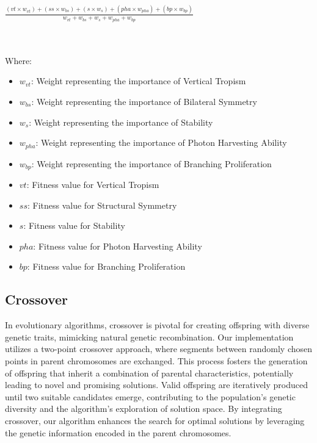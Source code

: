 \begin{large}
    $\frac{(vt \times w_{vt}) + (ss \times w_{bs}) + (s \times w_s) + (pha \times w_{pha}) + (bp \times w_{bp})}{w_{vt} + w_{bs} + w_s + w_{pha} + w_{bp}}$
\end{large}
\\
\\ 


Where:\\
\begin{itemize}
    \item $w_{vt}$: Weight representing the importance of Vertical Tropism
    \item $w_{bs}$: Weight representing the importance of Bilateral Symmetry
    \item $w_s$: Weight representing the importance of Stability
    \item $w_{pha}$: Weight representing the importance of Photon Harvesting Ability
    \item $w_{bp}$: Weight representing the importance of Branching Proliferation
    \item $vt$: Fitness value for Vertical Tropism
    \item $ss$: Fitness value for Structural Symmetry
    \item $s$: Fitness value for Stability
    \item $pha$: Fitness value for Photon Harvesting Ability
    \item $bp$: Fitness value for Branching Proliferation
\end{itemize}



\subsection{Crossover}
In evolutionary algorithms, crossover is pivotal for creating offspring with diverse genetic traits, mimicking natural genetic recombination. Our implementation utilizes a two-point crossover approach, where segments between randomly chosen points in parent chromosomes are exchanged. This process fosters the generation of offspring that inherit a combination of parental characteristics, potentially leading to novel and promising solutions. Valid offspring are iteratively produced until two suitable candidates emerge, contributing to the population's genetic diversity and the algorithm's exploration of solution space. By integrating crossover, our algorithm enhances the search for optimal solutions by leveraging the genetic information encoded in the parent chromosomes.\\

